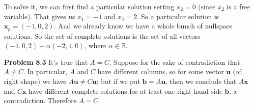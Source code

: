 \documentclass{article}
\begin{document}
To solve it, we can first find a particular solution setting $x_2 = 0$ (since $x_2$ is a free variable). That gives us $x_1 = -1$ and $x_3 = 2$. So a particular solution is $\mathbf{x}_p = (-1, 0, 2)$. And we already know we have a whole bunch of nullspace solutions. So the set of complete solutions is the set of all vectors $(-1, 0, 2) + \alpha (-2, 1, 0)$, where $\alpha \in \mathbb{R}$.

\noindent \textbf{Problem 8.3} It's true that $A = C$. Suppose for the sake of contradiction that $A \neq C$. In particular, $A$ and $C$ have different columns, so for some vector $\mathbf{u}$ (of right shape) we have $A\mathbf{u} \neq C\mathbf{u}$; but if we put $\mathbf{b} = A\mathbf{u}$, then we conclude that $A\mathbf{x}$ and $C\mathbf{x}$ have different complete solutions for at least one right hand side $\mathbf{b}$, a contradiction. Therefore $A = C$.
\end{document}
